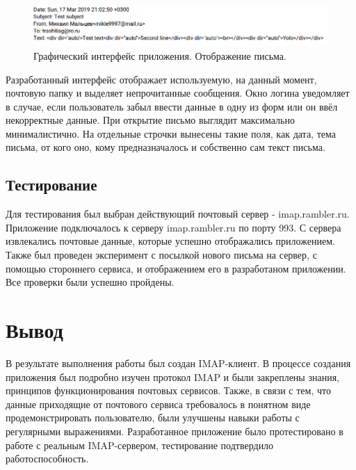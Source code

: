 \documentclass[a4paper,14pt]{extarticle}
\begin{document}
    \begin{figure}[H]
        \begin{center}
            \includegraphics[scale=0.55]{pics/letter}
            \caption{Графический интерфейс приложения. Отображение письма.}
            \label{letter}
        \end{center}
    \end{figure}

    Разработанный интерфейс отображает используемую, на данный момент,
    почтовую папку и выделяет непрочитанные сообщения.
    Окно логина уведомляет в случае, если пользователь забыл ввести данные в одну из форм
    или он ввёл некорректные данные. При открытие письмо выглядит максимально минималистично.
    На отдельные строчки вынесены такие поля, как дата, тема письма, от кого оно, кому предназначалось и собственно сам текст письма.

\subsection{Тестирование}

    Для тестирования был выбран действующий почтовый сервер - imap.rambler.ru. Приложение подключалось к серверу imap.rambler.ru по порту 993.
    С сервера извлекались почтовые данные, которые успешно отображались приложением. Также был проведен эксперимент с посылкой нового письма
    на сервер, с помощью стороннего сервиса, и отображением его в разработаном приложении. Все проверки были успешно пройдены.

\section{Вывод}

    В результате выполнения работы был создан IMAP-клиент. 
    В процессе создания приложения был подробно изучен протокол IMAP и были закреплены знания, принципов функционирования почтовых сервисов.
    Также, в связи с тем, что данные приходящие от почтового сервиса требовалось в понятном виде продемонстрировать пользователю,
    были улучшены навыки работы с регулярными выражениями.
    Разработанное приложение было протестировано в работе с реальным IMAP-сервером, тестирование подтвердило работоспособность.
\end{document}
